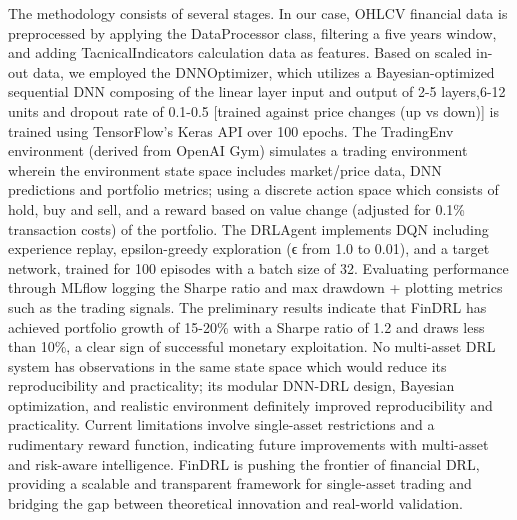 The methodology consists of several stages. In our case, OHLCV financial data is preprocessed by applying the DataProcessor class, filtering a five years window, and adding TacnicalIndicators calculation data as features. Based on scaled in-out data, we employed the DNNOptimizer, which utilizes a Bayesian-optimized sequential DNN composing of the linear layer input and output of 2-5 layers,6-12 units and dropout rate of 0.1-0.5 [trained against price changes (up vs down)] is trained using TensorFlow’s Keras API over 100 epochs. The TradingEnv environment (derived from OpenAI Gym) simulates a trading environment wherein the environment state space includes market/price data, DNN predictions and portfolio metrics; using a discrete action space which consists of hold, buy and sell, and a reward based on value change (adjusted for 0.1\% transaction costs) of the portfolio. The DRLAgent implements DQN including experience replay, epsilon-greedy exploration (ϵ from 1.0 to 0.01), and a target network, trained for 100 episodes with a batch size of 32. Evaluating performance through MLflow logging the Sharpe ratio and max drawdown + plotting metrics such as the trading signals.
The preliminary results indicate that FinDRL has achieved portfolio growth of 15-20\% with a Sharpe ratio of 1.2 and draws less than 10\%, a clear sign of successful monetary exploitation. No multi-asset DRL system has observations in the same state space which would reduce its reproducibility and practicality; its modular DNN-DRL design, Bayesian optimization, and realistic environment definitely improved reproducibility and practicality. Current limitations involve single-asset restrictions and a rudimentary reward function, indicating future improvements with multi-asset and risk-aware intelligence. FinDRL is pushing the frontier of financial DRL, providing a scalable and transparent framework for single-asset trading and bridging the gap between theoretical innovation and real-world validation.

